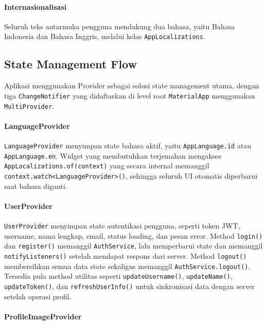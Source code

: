 \documentclass[11pt]{article}
\begin{document}
\paragraph{Internasionalisasi}

Seluruh teks antarmuka pengguna mendukung dua bahasa, yaitu Bahasa Indonesia dan Bahasa Inggris, melalui kelas \texttt{AppLocalizations}.

\subsection{State Management Flow}

Aplikasi menggunakan Provider sebagai solusi state management utama, dengan tiga \texttt{ChangeNotifier} yang didaftarkan di level root \texttt{MaterialApp} menggunakan \texttt{MultiProvider}.

\paragraph{LanguageProvider}

\texttt{LanguageProvider} menyimpan state bahasa aktif, yaitu \texttt{AppLanguage.id} atau \texttt{AppLanguage.en}. Widget yang membutuhkan terjemahan mengakses \texttt{AppLocalizations.of(context)} yang secara internal memanggil \texttt{context.watch<LanguageProvider>()}, sehingga seluruh UI otomatis diperbarui saat bahasa diganti.

\paragraph{UserProvider}

\texttt{UserProvider} menyimpan state autentikasi pengguna, seperti token JWT, username, nama lengkap, email, status loading, dan pesan error. Method \texttt{login()} dan \texttt{register()} memanggil \texttt{AuthService}, lalu memperbarui state dan memanggil \texttt{notifyListeners()} setelah mendapat respons dari server. Method \texttt{logout()} membersihkan semua data state sekaligus memanggil \texttt{AuthService.logout()}. Tersedia pula method utilitas seperti \texttt{updateUsername()}, \texttt{updateName()}, \texttt{updateToken()}, dan \texttt{refreshUserInfo()} untuk sinkronisasi data dengan server setelah operasi profil.

\paragraph{ProfileImageProvider}
\end{document}
